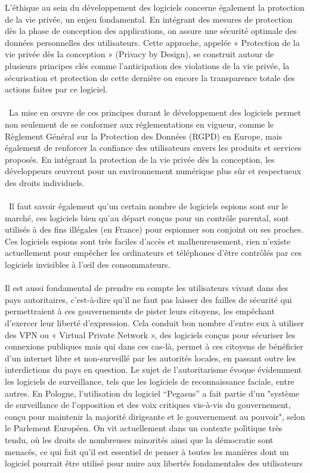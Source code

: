 \documentclass{article}
\begin{document}
L’éthique au sein du développement des logiciels concerne également la protection de la vie privée, un enjeu fondamental. En intégrant des mesures de protection dès la phase de conception des applications, on assure une sécurité optimale des données personnelles des utilisateurs. Cette approche, appelée « Protection de la vie privée dès la conception » (Privacy by Design), se construit autour de plusieurs principes clés comme l’anticipation des violations de la vie privée, la sécurisation et protection de cette dernière ou encore la transparence totale des actions faites par ce logiciel.
\\\\
 La mise en œuvre de ces principes durant le développement des logiciels permet non seulement de se conformer aux réglementations en vigueur, comme le Règlement Général sur la Protection des Données (RGPD) en Europe, mais également de renforcer la confiance des utilisateurs envers les produits et services proposés. En intégrant la protection de la vie privée dès la conception, les développeurs œuvrent pour un environnement numérique plus sûr et respectueux des droits individuels.
\\\\
 Il faut savoir également qu’un certain nombre de logiciels espions sont sur le marché, ces logiciels bien qu’au départ conçus pour un contrôle parental, sont utilisés à des fins illégales (en France) pour espionner son conjoint ou ses proches. Ces logiciels espions sont très faciles d’accès et malheureusement, rien n’existe actuellement pour empêcher les ordinateurs et téléphones d’être contrôlés par ces logiciels invisibles à l’œil des consommateurs.
\\\\
Il est aussi fondamental de prendre en compte les utilisateurs vivant dans des pays autoritaires, c’est-à-dire qu’il ne faut pas laisser des failles de sécurité qui permettraient à ces gouvernements de pister leurs citoyens, les empêchant d’exercer leur liberté d’expression. Cela conduit bon nombre d’entre eux à utiliser des VPN ou « Virtual Private Network », des logiciels conçus pour sécuriser les connexions publiques mais qui dans ces cas-là, permet à ces citoyens de bénéficier d’un internet libre et non-surveillé par les autorités locales, en passant outre les interdictions du pays en question. Le sujet de l’autoritarisme évoque évidemment les logiciels de surveillance, tels que les logiciels de reconnaissance faciale, entre autres. En Pologne, l’utilisation du logiciel “Pegasus” a fait partie d’un "système de surveillance de l'opposition et des voix critiques vis-à-vis du gouvernement, conçu pour maintenir la majorité dirigeante et le gouvernement au pouvoir", selon le Parlement Européen. On vit actuellement dans un contexte politique très tendu, où les droits de nombreuses minorités ainsi que la démocratie sont menacés, ce qui fait qu’il est essentiel de penser à toutes les manières dont un logiciel pourrait être utilisé pour nuire aux libertés fondamentales des utilisateurs\\
\end{document}

